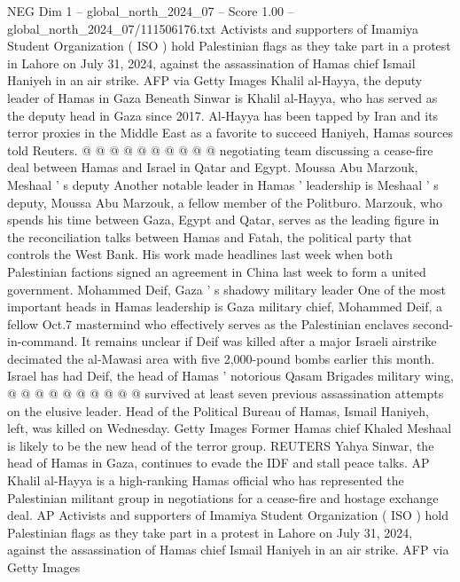 \begin{textsample}{NEG Dim 1 – global\_north\_2024\_07 – Score 1.00 – global\_north\_2024\_07/111506176.txt}
Activists and supporters of Imamiya Student Organization ( ISO ) hold Palestinian flags as they take part in a protest in Lahore on July 31, 2024, against the assassination of Hamas chief Ismail Haniyeh in an air strike.
AFP via Getty Images Khalil al-Hayya, the deputy leader of Hamas in Gaza Beneath Sinwar is Khalil al-Hayya, who has served as the deputy head in Gaza since 2017.
Al-Hayya has been tapped by Iran and its terror proxies in the Middle East as a favorite to succeed Haniyeh, Hamas sources told Reuters. @ @ @ @ @ @ @ @ @ @ negotiating team discussing a cease-fire deal between Hamas and Israel in Qatar and Egypt.
Moussa Abu Marzouk, Meshaal ' s deputy Another notable leader in Hamas ' leadership is Meshaal ' s deputy, Moussa Abu Marzouk, a fellow member of the Politburo.
Marzouk, who spends his time between Gaza, Egypt and Qatar, serves as the leading figure in the reconciliation talks between Hamas and Fatah, the political party that controls the West Bank.
His work made headlines last week when both Palestinian factions signed an agreement in China last week to form a united government.
Mohammed Deif, Gaza ' s shadowy military leader One of the most important heads in Hamas leadership is Gaza military chief, Mohammed Deif, a fellow Oct.7 mastermind who effectively serves as the Palestinian enclaves second-in-command.
It remains unclear if Deif was killed after a major Israeli airstrike decimated the al-Mawasi area with five 2,000-pound bombs earlier this month.
Israel has had Deif, the head of Hamas ' notorious Qasam Brigades military wing, @ @ @ @ @ @ @ @ @ @ survived at least seven previous assassination attempts on the elusive leader.
Head of the Political Bureau of Hamas, Ismail Haniyeh, left, was killed on Wednesday.
Getty Images Former Hamas chief Khaled Meshaal is likely to be the new head of the terror group.
REUTERS Yahya Sinwar, the head of Hamas in Gaza, continues to evade the IDF and stall peace talks.
AP Khalil al-Hayya is a high-ranking Hamas official who has represented the Palestinian militant group in negotiations for a cease-fire and hostage exchange deal.
AP Activists and supporters of Imamiya Student Organization ( ISO ) hold Palestinian flags as they take part in a protest in Lahore on July 31, 2024, against the assassination of Hamas chief Ismail Haniyeh in an air strike.
AFP via Getty Images

\end{textsample}
